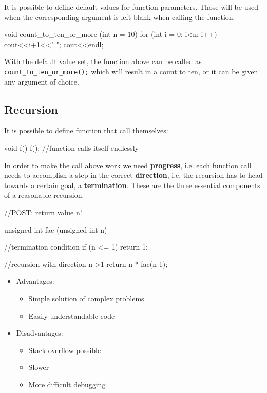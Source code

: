 \documentclass[10pt,a4paper]{scrartcl}
\begin{document}
\begin{multicols*}{2}
It is possible to define default values for function parameters. Those will be used when the corresponding argument is left blank when calling the function.

\begin{TPCpp}
void count_to_ten_or_more (int n = 10){
	for (int i = 0; i<n; i++){
		cout<<i+1<<" ";
	}
	cout<<endl;
}
\end{TPCpp}

With the default value set, the function above can be called as \verb+count_to_ten_or_more();+ which will result in a count to ten, or it can be given any argument of choice.

\subsection{Recursion}

It is possible to define function that call themselves:

\begin{TPCpp}
void f(){
	f(); //function calls itself endlessly
}
\end{TPCpp}

In order to make the call above work we need \textbf{progress}, i.e. each function call needs to accomplish a step in the correct \textbf{direction}, i.e. the recursion has to head towards a certain goal, a \textbf{termination}. These are the three essential components of a reasonable recursion.

\begin{TPCpp}
//POST: return value n!

unsigned int fac (unsigned int n)
{
	//termination condition
	if (n <= 1) return 1;
	
	//recursion with direction n->1
	return n * fac(n-1);
}
\end{TPCpp}

\begin{itemize}
\item Advantages:
\begin{itemize}
\item Simple solution of complex problems
\item Easily understandable code
\end{itemize}
\item Disadvantages:
\begin{itemize}
\item Stack overflow possible
\item Slower
\item More difficult debugging
\end{itemize}
\end{itemize}


\end{multicols*}
\end{document}
